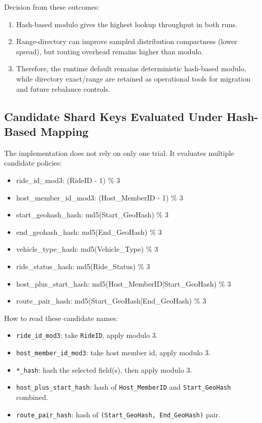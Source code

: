 \documentclass[12pt]{article}
\begin{document}
Decision from these outcomes:
\begin{enumerate}
    \item Hash-based modulo gives the highest lookup throughput in both runs.
    \item Range-directory can improve sampled distribution compactness (lower spread), but routing overhead remains higher than modulo.
    \item Therefore, the runtime default remains deterministic hash-based modulo, while directory exact/range are retained as operational tools for migration and future rebalance controls.
\end{enumerate}

\subsection{Candidate Shard Keys Evaluated Under Hash-Based Mapping}

The implementation does not rely on only one trial. It evaluates multiple candidate policies:
\begin{itemize}
    \item ride\_id\_mod3: (RideID - 1) \% 3
    \item host\_member\_id\_mod3: (Host\_MemberID - 1) \% 3
    \item start\_geohash\_hash: md5(Start\_GeoHash) \% 3
    \item end\_geohash\_hash: md5(End\_GeoHash) \% 3
    \item vehicle\_type\_hash: md5(Vehicle\_Type) \% 3
    \item ride\_status\_hash: md5(Ride\_Status) \% 3
    \item host\_plus\_start\_hash: md5(Host\_MemberID|Start\_GeoHash) \% 3
    \item route\_pair\_hash: md5(Start\_GeoHash|End\_GeoHash) \% 3
\end{itemize}

How to read these candidate names:
\begin{itemize}
    \item \texttt{ride\_id\_mod3}: take \texttt{RideID}, apply modulo 3.
    \item \texttt{host\_member\_id\_mod3}: take host member id, apply modulo 3.
    \item \texttt{*\_hash}: hash the selected field(s), then apply modulo 3.
    \item \texttt{host\_plus\_start\_hash}: hash of \texttt{Host\_MemberID} and \texttt{Start\_GeoHash} combined.
    \item \texttt{route\_pair\_hash}: hash of \texttt{(Start\_GeoHash, End\_GeoHash)} pair.
\end{itemize}
\end{document}
